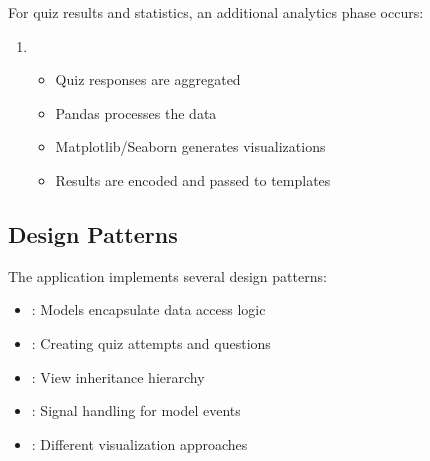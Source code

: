\documentclass[letterpaper,10pt,english]{sphinxmanual}
\begin{document}
\sphinxAtStartPar
For quiz results and statistics, an additional analytics phase occurs:
\begin{enumerate}
%
\setcounter{enumi}{3}
\item {} 
\sphinxAtStartPar
{}
\begin{itemize}
\item {} 
\sphinxAtStartPar
Quiz responses are aggregated

\item {} 
\sphinxAtStartPar
Pandas processes the data

\item {} 
\sphinxAtStartPar
Matplotlib/Seaborn generates visualizations

\item {} 
\sphinxAtStartPar
Results are encoded and passed to templates

\end{itemize}

\end{enumerate}


\subsection{Design Patterns}
\label{\detokenize{architecture:design-patterns}}
\sphinxAtStartPar
The application implements several design patterns:
\begin{itemize}
\item {} 
\sphinxAtStartPar
{}: Models encapsulate data access logic

\item {} 
\sphinxAtStartPar
{}: Creating quiz attempts and questions

\item {} 
\sphinxAtStartPar
{}: View inheritance hierarchy

\item {} 
\sphinxAtStartPar
{}: Signal handling for model events

\item {} 
\sphinxAtStartPar
{}: Different visualization approaches

\end{itemize}
\end{document}
